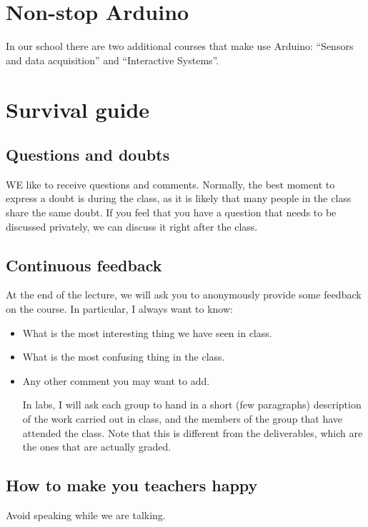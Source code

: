 \section{Non-stop Arduino}
In our school there are two additional courses that make use Arduino: ``Sensors and data acquisition'' and ``Interactive Systems''.

\section{Survival guide}

\subsection{Questions and doubts}
WE like to receive questions and comments.
Normally, the best moment to express a doubt is during the class, as it is likely that many people in the class share the same doubt.
If you feel that you have a question that needs to be discussed privately, we can discuss it right after the class.

\subsection{Continuous feedback}
At the end of the lecture, we will ask you to anonymously provide some feedback on the course. 
In particular, I always want to know:
\begin{itemize}
\item What is the most interesting thing we have seen in class.
\item What is the most confusing thing in the class.
\item Any other comment you may want to add.

In labs, I will ask each group to hand in a short (few paragraphs) description of the work carried out in class, and the members of the group that have attended the class.
Note that this is different from the deliverables, which are the ones that are actually graded.
\end{itemize}

\subsection{How to make you teachers happy}

Avoid speaking while we are talking.
